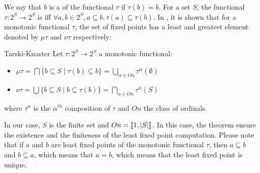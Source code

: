We say that $b$ is a  of the functional $\tau$ if $\tau(b) = b$.
For a set $S$, the functional $\tau: 2^S \rightarrow 2^S$ is   iff $\forall a,b \in 2^S, a \subseteq b, \tau(a) \subseteq \tau(b)$.
In \cite{tarski}, it is shown that for a monotonic functional $\tau$,
the set of fixed points has a least and greatest element denoted by $\mu \tau$ and $\nu \tau$ respectively:

\begin{namedtheo}{Tarski-Knaster}\label{th:tarski}
Let $\tau:2^S \rightarrow 2^S$ a monotonic functional:
\begin{itemize}
\item $\mu \tau = \bigcap \{b \subseteq S \mid \tau(b) \subseteq b\} = \bigcup_{\alpha \in On} \tau^{\alpha}(\emptyset)$
\item $\nu \tau = \bigcup \{b \subseteq S \mid b \subseteq \tau(b) \} = \bigcap_{\alpha \in On} \tau^{\alpha}(S)$
\end{itemize}
where $\tau^{\alpha}$ is the $\alpha^{th}$ composition of $\tau$ and $On$ the class of ordinals.
\end{namedtheo}
In our case, $S$ is the finite set and $On = \left \llbracket 1,|S|\right \rrbracket$. 
In this case, the theorem ensure the existence and the finiteness of the least fixed point computation.
Please note that if $a$ and $b$ are least fixed points of the monotonic functional $\tau$, then $a \subseteq b$ and $b \subseteq a$, which means that $a=b$, which means that the least fixed point is unique.



%
%


